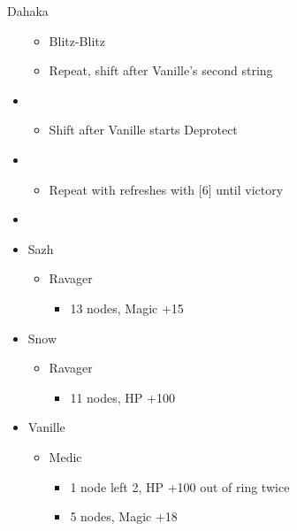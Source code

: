 \begin{multicols}{2}
\begin{battle}{Dahaka}
\begin{itemize}
\begin{itemize}
        \item Blitz-Blitz
        \item Repeat, shift after Vanille's second string
    \end{itemize}
    \item \fifth
    \begin{itemize}
        \item Shift after Vanille starts Deprotect
    \end{itemize}
    \item \fourth
    \begin{itemize}
        \item Repeat with refreshes with [6] until victory
    \end{itemize}
\end{itemize}
\end{battle}
\begin{menu}
\begin{itemize}
    \paradigm
    \begin{itemize}
        \item {}%
{}%
{\paradigmline{(\rav)}{\rav}{\rav}}%
{\paradigmline{\rav}{(\rav)}{(\med)}}%
{\paradigmline{\com}{\com}{(\med)}}%
{\paradigmline[5]{\textit{\rav}}{\textit{(\rav)}}{\textit{\sab}}}%
{\paradigmline{\com}{\com}{\rav}}
    \end{itemize}
    \crystarium
    \begin{itemize}
        \item Sazh
        \begin{itemize}
            \item Ravager
            \begin{itemize}
                \item 13 nodes, Magic +15
            \end{itemize}
        \end{itemize}
        \item Snow
        \begin{itemize}
            \item Ravager
            \begin{itemize}
                \item 11 nodes, HP +100
            \end{itemize}
        \end{itemize}
        \item Vanille
        \begin{itemize}
            \item Medic
            \begin{itemize}
                \item 1 node left 2, HP +100 out of ring twice
                \item 5 nodes, Magic +18
            \end{itemize}
        \end{itemize}
    \end{itemize}
\end{itemize}
\end{menu}



\end{multicols}

